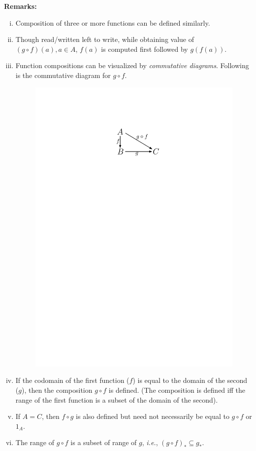 \documentclass[a4paper,english,12pt]{article}
\begin{document}
\textbf{Remarks:}
\begin{enumerate}[i)]
\item Composition of three or more functions can be defined similarly.
\item Though read/written left to write, while obtaining value of $(g\circ f)(a),a\in A$, $f(a)$ is computed first followed by $g(f(a))$.
\item Function compositions can be visualized by \textit{commutative diagrams}. Following is the commutative diagram for $g\circ f$.
\begin{figure}[h]
\centering
\includegraphics[scale=0.8]{Figures/l5f3_commdiag.pdf}
\end{figure}
\item If the codomain of the first function ($f$) is equal to the domain of the second ($g$), then the composition $g\circ f$ is defined. (The composition is defined iff the range of the first function is a subset of the domain of the second).
\item If $A=C$, then $f\circ g$ is also defined but need not necessarily be equal to $g\circ f$ or $1_A$.
\item The range of $g\circ f$ is a subset of range of $g$, \textit{i.e.}, $(g\circ f)_*\subseteq g_*$.
\end{enumerate}
\end{document}
